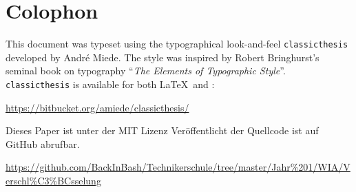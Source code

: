 
\pagestyle{empty}

\hfill

\vfill


\section*{Colophon}

This document was typeset using the typographical look-and-feel \texttt{classicthesis} developed by Andr\'e Miede. The style was inspired by Robert Bringhurst's seminal book on typography ``\emph{The Elements of Typographic Style}''. \texttt{classicthesis} is available for both \LaTeX\ and \mLyX: 

\begin{center}
\url{https://bitbucket.org/amiede/classicthesis/}
\end{center}

\noindent Dieses Paper ist unter der MIT Lizenz Veröffentlicht der Quellcode ist auf GitHub abrufbar.

\begin{center}
\url{https://github.com/BackInBash/Technikerschule/tree/master/Jahr%201/WIA/Verschl%C3%BCsselung}
\end{center}
 
\bigskip

\noindent\finalVersionString